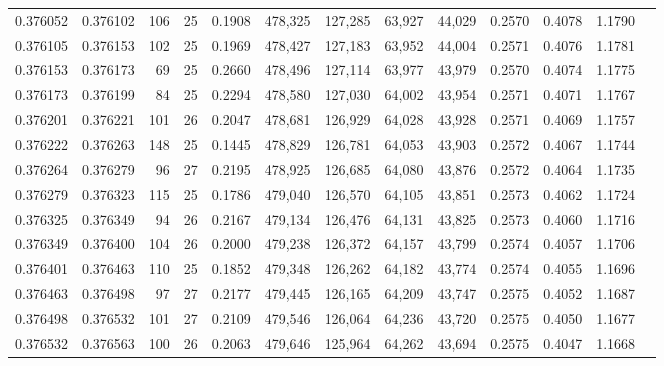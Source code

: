 \begin{tabular}{rrrrrrrrrrrrr}
0.376052 & 0.376102 &   106 &  25 &                                     0.1908 & 478,325 & 127,285 &  63,927 &  44,029 & 0.2570 & 0.4078 & 1.1790 \\
0.376105 & 0.376153 &   102 &  25 &                                     0.1969 & 478,427 & 127,183 &  63,952 &  44,004 & 0.2571 & 0.4076 & 1.1781 \\
0.376153 & 0.376173 &    69 &  25 &                                     0.2660 & 478,496 & 127,114 &  63,977 &  43,979 & 0.2570 & 0.4074 & 1.1775 \\
0.376173 & 0.376199 &    84 &  25 &                                     0.2294 & 478,580 & 127,030 &  64,002 &  43,954 & 0.2571 & 0.4071 & 1.1767 \\
0.376201 & 0.376221 &   101 &  26 &                                     0.2047 & 478,681 & 126,929 &  64,028 &  43,928 & 0.2571 & 0.4069 & 1.1757 \\
0.376222 & 0.376263 &   148 &  25 &                                     0.1445 & 478,829 & 126,781 &  64,053 &  43,903 & 0.2572 & 0.4067 & 1.1744 \\
0.376264 & 0.376279 &    96 &  27 &                                     0.2195 & 478,925 & 126,685 &  64,080 &  43,876 & 0.2572 & 0.4064 & 1.1735 \\
0.376279 & 0.376323 &   115 &  25 &                                     0.1786 & 479,040 & 126,570 &  64,105 &  43,851 & 0.2573 & 0.4062 & 1.1724 \\
0.376325 & 0.376349 &    94 &  26 &                                     0.2167 & 479,134 & 126,476 &  64,131 &  43,825 & 0.2573 & 0.4060 & 1.1716 \\
0.376349 & 0.376400 &   104 &  26 &                                     0.2000 & 479,238 & 126,372 &  64,157 &  43,799 & 0.2574 & 0.4057 & 1.1706 \\
0.376401 & 0.376463 &   110 &  25 &                                     0.1852 & 479,348 & 126,262 &  64,182 &  43,774 & 0.2574 & 0.4055 & 1.1696 \\
0.376463 & 0.376498 &    97 &  27 &                                     0.2177 & 479,445 & 126,165 &  64,209 &  43,747 & 0.2575 & 0.4052 & 1.1687 \\
0.376498 & 0.376532 &   101 &  27 &                                     0.2109 & 479,546 & 126,064 &  64,236 &  43,720 & 0.2575 & 0.4050 & 1.1677 \\
0.376532 & 0.376563 &   100 &  26 &                                     0.2063 & 479,646 & 125,964 &  64,262 &  43,694 & 0.2575 & 0.4047 & 1.1668 \\

\end{tabular}
